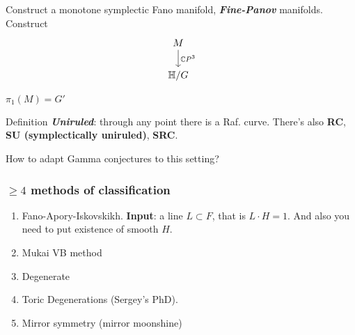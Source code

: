 Construct a monotone symplectic Fano manifold, \textit{\textbf{Fine-Panov}} manifolds. Construct
\[\begin{tikzcd}
M\arrow[d,"\mathbb{C}P^{3}"]\\
\mathbb{H}/G
\end{tikzcd}\]

\begin{coro}\leavevmode
	$\pi_{1}(M)=G'$
\end{coro}

\begin{thing4}{Definition}\leavevmode
\textit{\textbf{Uniruled}}: through any point there is a Raf. curve. There's also {\bfseries RC}, {\bfseries SU (symplectically uniruled)}, {\bfseries SRC}.
\end{thing4}

\begin{question}[Sergey]\leavevmode
	How to adapt Gamma conjectures to this setting?
\end{question}

\subsubsection{$\geq 4$ methods of classification}

\begin{enumerate}
\item Fano-Apory-Iskovskikh. \textbf{Input}: a line $L \subset F$, that is $L\cdot H=1$. And also you need to put existence of smooth $H$.

\item Mukai VB method
\item Degenerate
\item Toric Degenerations (Sergey's PhD).
\item Mirror symmetry (mirror moonshine)
\end{enumerate}


